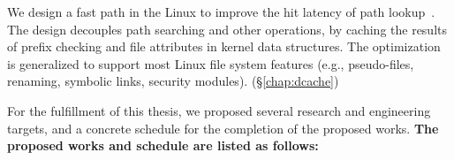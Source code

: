 \begin{compactitem}
\item We design a fast path in the Linux 
to improve the hit latency of path lookup~\citep{tsai15dcache}.
The design decouples path searching and other operations,
by caching the results of prefix checking and file attributes in kernel data structures.
The optimization is generalized to support most Linux file system features
(e.g., pseudo-files, renaming, symbolic links, security modules).
(\S\ref{chap:dcache})


\end{compactitem}


\vspace{\baselineskip}
\noindent
For the fulfillment of this thesis, we proposed several research and engineering
targets, and a concrete schedule for the completion of the proposed works. {\bf The proposed works and schedule are listed as follows:}


%
%


